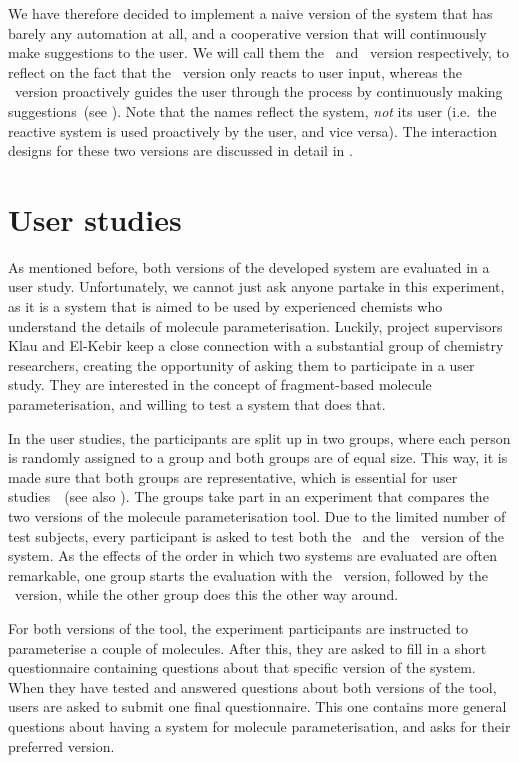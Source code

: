 We have therefore decided to implement a naive version of the system that has barely any automation at all, and a cooperative version that will continuously make suggestions to the user. We will call them the \IDa\ and \IDb\ version respectively, to reflect on the fact that the \IDa\ version only reacts to user input, whereas the \IDb\ version proactively guides the user through the process by continuously making suggestions~(see ). Note that the names reflect the system, \emph{not} its user (i.e.\ the reactive system is used proactively by the user, and vice versa). The interaction designs for these two versions are discussed in detail in .



\vspace{-.2em}
\section{User studies}
\vspace{-.2em}
As mentioned before, both versions of the developed system are evaluated in a user study. Unfortunately, we cannot just ask anyone partake in this experiment, as it is a system that is aimed to be used by experienced chemists who understand the details of molecule parameterisation. Luckily, project supervisors Klau and El-Kebir keep a close connection with a substantial group of chemistry researchers, creating the opportunity of asking them to participate in a user study. They are interested in the concept of fragment-based molecule parameterisation, and willing to test a system that does that.

In the user studies, the participants are split up in two groups, where each person is randomly assigned to a group and both groups are of equal size. This way, it is made sure that both groups are representative, which is essential for user studies~\cite{wohlin2003empirical}~(see also ). The groups take part in an experiment that compares the two versions of the molecule parameterisation tool. Due to the limited number of test subjects, every participant is asked to test both the \IDa\ and the \IDb\ version of the system. As the effects of the order in which two systems are evaluated are often remarkable, one group starts the evaluation with the \IDa\ version, followed by the \IDb\ version, while the other group does this the other way around.

For both versions of the tool, the experiment participants are instructed to parameterise a couple of molecules. After this, they are asked to fill in a short questionnaire containing questions about that specific version of the system. When they have tested and answered questions about both versions of the tool, users are asked to submit one final questionnaire. This one contains more general questions about having a system for molecule parameterisation, and asks for their preferred version.


